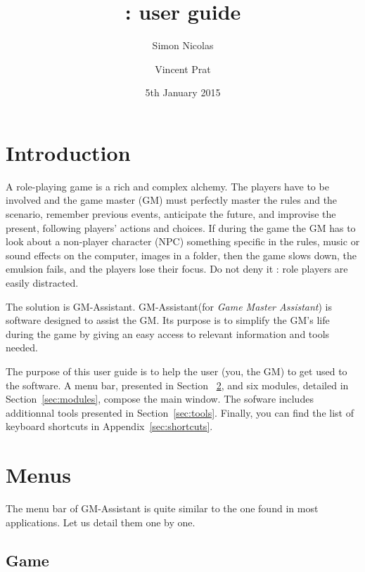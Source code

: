 \documentclass[a4paper,12pt]{article}
\title{\GMA \versionnumber: user guide}
\author{Simon Nicolas \and Vincent Prat}
\date{5th January 2015}
\newcommand*{\GMA}{GM-Assistant\xspace}
\begin{document}
\maketitle

\tableofcontents

\section{Introduction}

A role-playing game is a rich and complex alchemy.
The players have to be involved and the game master (GM) must perfectly master the rules and the scenario, remember previous events, anticipate the future, and improvise the present, following players' actions and choices.
If during the game the GM has to look about a non-player character (NPC) something specific in the rules, music or sound effects on the computer, images in a folder, then the game slows down, the emulsion fails, and the players lose their focus.
Do not deny it : role players are easily distracted.

The solution is \GMA.
\GMA (for \emph{Game Master Assistant}) is software designed to assist the GM. Its purpose is to simplify the GM’s life during the game by giving an easy access to relevant information and tools needed.

The purpose of this user guide is to help the user (you, the GM) to get used to the software. A menu bar, presented in Section ~\ref{menu}, and six modules, detailed in Section~\ref{sec:modules}, compose the main window. The sofware includes additionnal tools presented in Section~\ref{sec:tools}.
Finally, you can find the list of keyboard shortcuts in Appendix~\ref{sec:shortcuts}. 

\section{Menus}
\label{menu}

The menu bar of \GMA is quite similar to the one found in most applications.
Let us detail them one by one.
\subsection{Game}
\label{sec:game}
\end{document}
